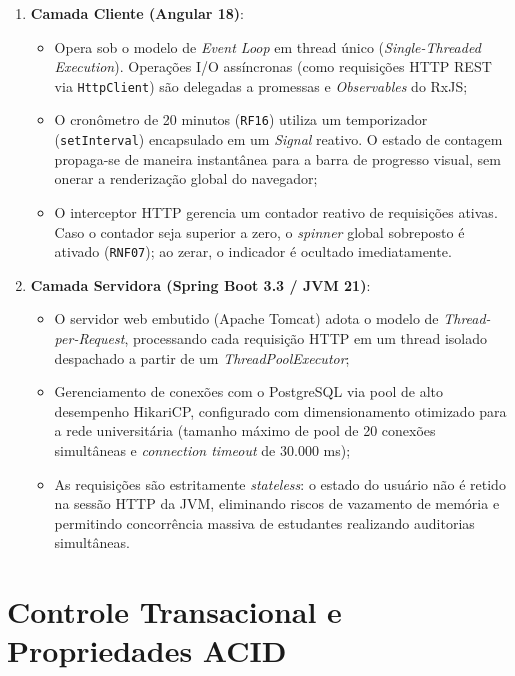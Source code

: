 \begin{enumerate}
    \item \textbf{Camada Cliente (Angular 18)}:
    \begin{itemize}
        \item Opera sob o modelo de \textit{Event Loop} em thread único (\textit{Single-Threaded Execution}). Operações I/O assíncronas (como requisições HTTP REST via \texttt{HttpClient}) são delegadas a promessas e \textit{Observables} do RxJS;
        \item O cronômetro de 20 minutos (\texttt{RF16}) utiliza um temporizador (\texttt{setInterval}) encapsulado em um \textit{Signal} reativo. O estado de contagem propaga-se de maneira instantânea para a barra de progresso visual, sem onerar a renderização global do navegador;
        \item O interceptor HTTP gerencia um contador reativo de requisições ativas. Caso o contador seja superior a zero, o \textit{spinner} global sobreposto é ativado (\texttt{RNF07}); ao zerar, o indicador é ocultado imediatamente.
    \end{itemize}

    \item \textbf{Camada Servidora (Spring Boot 3.3 / JVM 21)}:
    \begin{itemize}
        \item O servidor web embutido (Apache Tomcat) adota o modelo de \textit{Thread-per-Request}, processando cada requisição HTTP em um thread isolado despachado a partir de um \textit{ThreadPoolExecutor};
        \item Gerenciamento de conexões com o PostgreSQL via pool de alto desempenho HikariCP, configurado com dimensionamento otimizado para a rede universitária (tamanho máximo de pool de 20 conexões simultâneas e \textit{connection timeout} de 30.000 ms);
        \item As requisições são estritamente \textit{stateless}: o estado do usuário não é retido na sessão HTTP da JVM, eliminando riscos de vazamento de memória e permitindo concorrência massiva de estudantes realizando auditorias simultâneas.
    \end{itemize}
\end{enumerate}

\section{Controle Transacional e Propriedades ACID}
\label{sec_controle_transacional}

